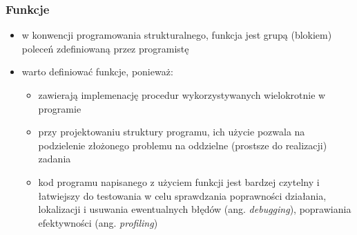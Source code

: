 \begin{frame}
\frametitle{Funkcje}

\begin{itemize}\small
 \item w konwencji programowania strukturalnego, funkcja jest grupą
 (blokiem) poleceń zdefiniowaną przez programistę

 \item warto definiować funkcje, ponieważ:

\begin{itemize}\small

 \item zawierają implemenację procedur wykorzystywanych wielokrotnie w
 programie

 \item przy projektowaniu struktury programu, ich użycie pozwala na
 podzielenie złożonego problemu na oddzielne (prostsze do realizacji)
 zadania

 \item kod programu napisanego z użyciem funkcji jest bardzej czytelny
 i łatwiejszy do testowania w celu sprawdzania poprawności działania,
 lokalizacji i usuwania ewentualnych błędów (ang. \emph{debugging}),
 poprawiania efektywności (ang. \emph{profiling})

\end{itemize}
\end{itemize}
\end{frame}

